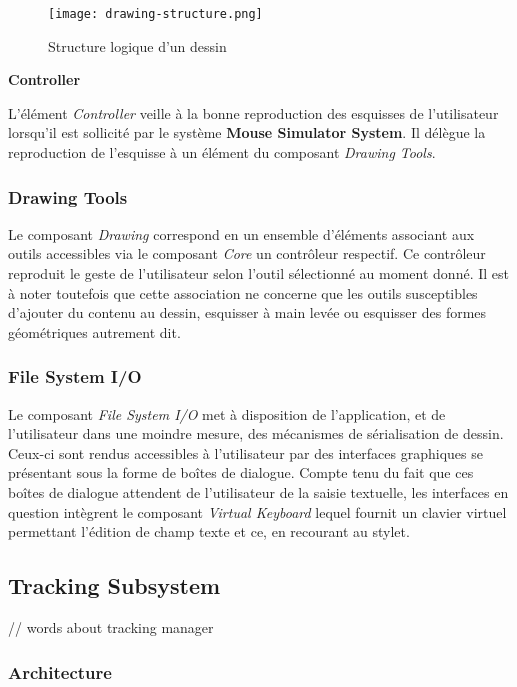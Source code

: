 \documentclass[11pt,a4paper,oldfontcommands]{memoir}
\begin{document}
\begin{figure}[H]
\centering
\texttt{[image: drawing-structure.png]}
\caption{Structure logique d’un dessin}
\end{figure}

\textbf{Controller}

L'élément \textit{Controller} veille à la bonne reproduction des esquisses de l'utilisateur lorsqu'il est sollicité par le système \textbf{Mouse Simulator System}. Il délègue la reproduction de l'esquisse à un élément du composant \textit{Drawing Tools}.

\subsubsection{Drawing Tools}

Le composant \textit{Drawing} correspond en un ensemble d'éléments associant aux outils accessibles via le composant \textit{Core} un contrôleur respectif. Ce contrôleur reproduit le geste de l'utilisateur selon l'outil sélectionné au moment donné. Il est à noter toutefois que cette association ne concerne que les outils susceptibles d'ajouter du contenu au dessin, esquisser à main levée ou esquisser des formes géométriques autrement dit.

\subsubsection{File System I/O}

Le composant \textit{File System I/O} met à disposition de l'application, et de l'utilisateur dans une moindre mesure, des mécanismes de sérialisation de dessin. Ceux-ci sont rendus accessibles à l'utilisateur par des interfaces graphiques se présentant sous la forme de boîtes de dialogue. Compte tenu du fait que ces boîtes de dialogue attendent de l'utilisateur de la saisie textuelle, les interfaces en question intègrent le composant \textit{Virtual Keyboard} lequel fournit un clavier virtuel permettant l'édition de champ texte et ce, en recourant au stylet.

\newpage

\subsection{Tracking Subsystem}

// words about tracking manager

\subsubsection{Architecture}
\end{document}
